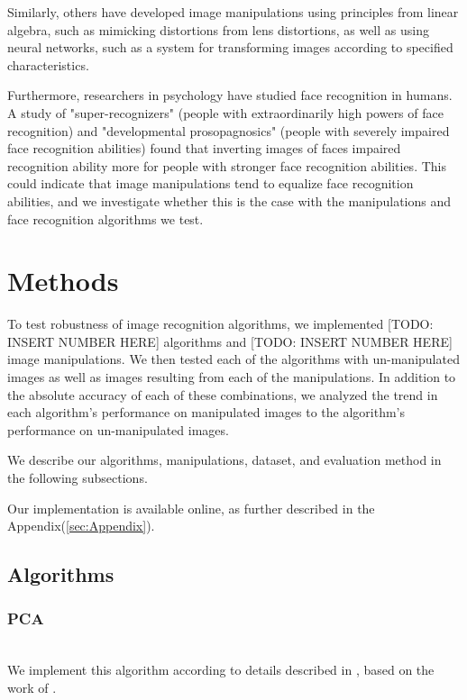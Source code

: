 \documentclass[pageno]{cos429}
\begin{document}
Similarly, others have developed image manipulations using principles from linear algebra, such as mimicking distortions from lens distortions, as well as using neural networks, such as a system for transforming images according to specified characteristics\cite{savarese_camera_2015}\cite{upchurch_deep_2016}.

Furthermore, researchers in psychology have studied face recognition in humans. A study of "super-recognizers" (people with extraordinarily high powers of face recognition) and "developmental prosopagnosics" (people with severely impaired face recognition abilities) found that inverting images of faces impaired recognition ability more for people with stronger face recognition abilities\cite{russell_super-recognizers:_2009}. This could indicate that image manipulations tend to equalize face recognition abilities, and we investigate whether this is the case with the manipulations and face recognition algorithms we test.

\section{Methods}
To test robustness of image recognition algorithms, we implemented [TODO: INSERT NUMBER HERE] algorithms and [TODO: INSERT NUMBER HERE] image manipulations. We then tested each of the algorithms with un-manipulated images as well as images resulting from each of the manipulations. In addition to the absolute accuracy of each of these combinations, we analyzed the trend in each algorithm's performance on manipulated images to the algorithm's performance on un-manipulated images.

We describe our algorithms, manipulations, dataset, and evaluation method in the following subsections.

Our implementation is available online, as further described in the Appendix(\ref{sec:Appendix}).

\subsection{Algorithms}
\subsubsection{PCA}\hspace*{\fill} \\
We implement this algorithm according to details described in \cite{vidal_eigenfaces_2008}, based on the work of \cite{turk_eigenfaces_1991}.
\end{document}
